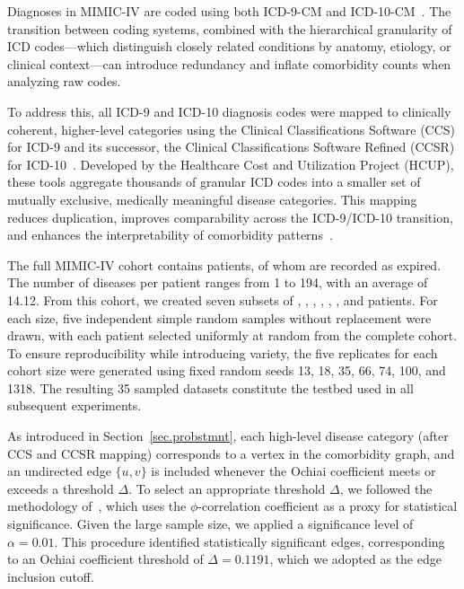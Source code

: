 Diagnoses in MIMIC-IV are coded using both ICD-9-CM and
ICD-10-CM~\citep{cdc_icd9cm_2013, cdc_icd10cm_2022}. The transition
between coding systems, combined with the hierarchical granularity of
ICD codes---which distinguish closely related conditions by anatomy,
etiology, or clinical context---can introduce redundancy and inflate
comorbidity counts when analyzing raw codes.

To address this, all ICD-9 and ICD-10 diagnosis codes were mapped to
clinically coherent, higher-level categories using the Clinical
Classifications Software (CCS) for ICD-9 and its successor, the
Clinical Classifications Software Refined (CCSR) for
ICD-10~\citep{toolssoftware}. Developed by the Healthcare Cost and
Utilization Project (HCUP), these tools aggregate thousands of
granular ICD codes into a smaller set of mutually exclusive,
medically meaningful disease categories. This mapping reduces
duplication, improves comparability across the ICD-9/ICD-10
transition, and enhances the interpretability of comorbidity
patterns~\citep{malecki2024development}.

The full MIMIC-IV cohort contains  patients, of whom
 are recorded as expired. The number of diseases per patient ranges from 1 to 194, with an average of 14.12. From this cohort, we created seven subsets of , , , , , , and
 patients. For each size, five independent simple
random samples without replacement were drawn, with each patient
selected uniformly at random from the complete cohort. To ensure
reproducibility while introducing variety, the five replicates for
each cohort size were generated using fixed random seeds 13, 18, 35,
66, 74, 100, and 1318. The resulting 35 sampled datasets constitute
the testbed used in all subsequent experiments.

As introduced in Section~\ref{sec.probstmnt}, each high-level disease
category (after CCS and CCSR mapping) corresponds to a vertex in the
comorbidity graph, and an undirected edge $\{u,v\}$ is included
whenever the Ochiai coefficient meets or exceeds a
threshold $\Delta$.
To select an appropriate threshold $\Delta$, we followed the
methodology of~\citet{KALGOTRA2020}, which uses the $\phi$-correlation
coefficient as a proxy for statistical significance. Given the
large sample size, we applied a significance level of $\alpha = 0.01$.
This procedure identified  statistically significant
edges, corresponding to an Ochiai coefficient threshold of $\Delta = 0.1191$, which
we adopted as the edge inclusion cutoff.

